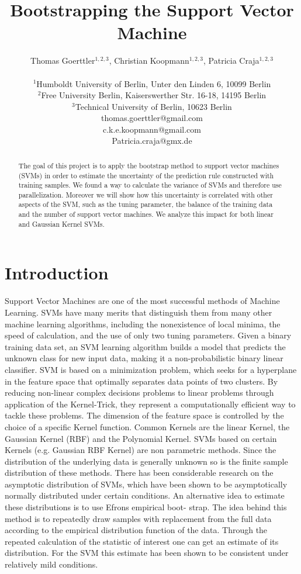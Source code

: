 \documentclass[a4paper]{article}
\title{Bootstrapping the Support Vector Machine}
\author{Thomas Goerttler$^{1,2,3}$, Christian Koopmann$^{1,2,3}$, Patricia Craja$^{1,2,3}$ \\
\mbox{}\\
$^1$Humboldt University of Berlin, Unter den Linden 6, 10099 Berlin \\
$^2$Free University Berlin, Kaiserswerther Str. 16-18, 14195 Berlin \\
$^3$Technical University of Berlin, 10623 Berlin \\
thomas.goerttler@gmail.com\\
c.k.e.koopmann@gmail.com\\
Patricia.craja@gmx.de\\
}
\begin{document}
\maketitle

\begin{abstract}
The goal of this project is to apply the bootstrap method to support vector machines (SVMs) in order to estimate the uncertainty of the prediction rule constructed with training samples. We found a way to calculate the variance of SVMs and therefore use parallelization. Moreover we will show how this uncertainty is correlated with other aspects of the SVM, such as the tuning parameter, the balance of the training data and the number of support vector machines. We analyze this impact for both linear and Gaussian Kernel SVMs.
  
\end{abstract}

\section{Introduction}

	Support Vector Machines are one of the most successful methods of Machine Learning. SVMs have many merits that distinguish them from many other machine learning algorithms, including the nonexistence of local minima, the speed of calculation, and the use of only two tuning parameters. Given a binary training data set, an SVM learning algorithm builds a model that predicts the unknown class for new input data, making it a non-probabilistic binary linear classifier. SVM is based on a minimization problem, which seeks for a hyperplane in the feature space that optimally separates data points of two clusters.  By reducing non-linear complex decisions problems to linear problems through application of the Kernel-Trick, they represent a computationally efficient way to tackle these problems. The dimension of the feature space is controlled by the choice of a specific Kernel function. Common Kernels are the linear Kernel, the Gaussian Kernel (RBF) and the Polynomial Kernel.
    SVMs based on certain Kernels (e.g. Gaussian RBF Kernel) are non parametric methods. Since the distribution of the underlying data is generally unknown so is the finite sample distribution of these methods. 
There has been considerable research on the asymptotic distribution of SVMs, which have been shown to be asymptotically normally distributed under certain conditions. An alternative idea to estimate these distributions is to use Efrons empirical boot- strap. The idea behind this method is to repeatedly draw samples with replacement from the full data according to the empirical distribution function of the data. Through the repeated calculation of the statistic of interest one can get an estimate of its distribution. For the SVM this estimate has been shown to be consistent under relatively mild conditions.
    
\end{document}
